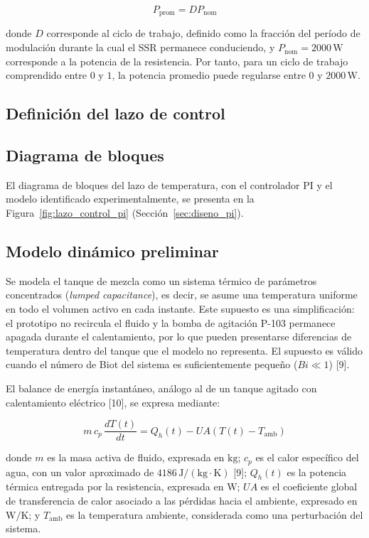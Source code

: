 \begin{equation}
P_{\mathrm{prom}} = D P_{\mathrm{nom}}
\end{equation}

donde $D$ corresponde al ciclo de trabajo, definido como la fracción del período de modulación durante la cual el SSR permanece conduciendo, y $P_{\mathrm{nom}} = 2000\,\mathrm{W}$ corresponde a la potencia de la resistencia. Por tanto, para un ciclo de trabajo comprendido entre $0$ y $1$, la potencia promedio puede regularse entre $0$ y $2000\,\mathrm{W}$.

\subsection{Definición del lazo de control}


\subsection{Diagrama de bloques}
El diagrama de bloques del lazo de temperatura, con el controlador PI y el modelo identificado experimentalmente, se presenta en la Figura~\ref{fig:lazo_control_pi} (Sección~\ref{sec:diseno_pi}).

\subsection{Modelo dinámico preliminar}\label{sec:modelo_dinamico}

Se modela el tanque de mezcla como un sistema térmico de parámetros concentrados (\textit{lumped capacitance}), es decir, se asume una temperatura uniforme en todo el volumen activo en cada instante. Este supuesto es una simplificación: el prototipo no recircula el fluido y la bomba de agitación P-103 permanece apagada durante el calentamiento, por lo que pueden presentarse diferencias de temperatura dentro del tanque que el modelo no representa. El supuesto es válido cuando el número de Biot del sistema es suficientemente pequeño ($Bi \ll 1$) [9].

El balance de energía instantáneo, análogo al de un tanque agitado con calentamiento eléctrico [10], se expresa mediante:

\begin{equation}
m\,c_p\,\frac{dT(t)}{dt} = Q_h(t) - UA\left(T(t)-T_{\mathrm{amb}}\right)
\end{equation}

donde $m$ es la masa activa de fluido, expresada en $\mathrm{kg}$; $c_p$ es el calor específico del agua, con un valor aproximado de $4186\,\mathrm{J/(kg\cdot K)}$ [9]; $Q_h(t)$ es la potencia térmica entregada por la resistencia, expresada en $\mathrm{W}$; $UA$ es el coeficiente global de transferencia de calor asociado a las pérdidas hacia el ambiente, expresado en $\mathrm{W/K}$; y $T_{\mathrm{amb}}$ es la temperatura ambiente, considerada como una perturbación del sistema.


